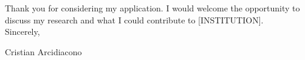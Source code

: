 \documentclass[11pt]{article}
\begin{document}
Thank you for considering my application. I would welcome the opportunity to discuss my research and what I could contribute to [INSTITUTION]. \\

Sincerely,

Cristian Arcidiacono

\end{document}
